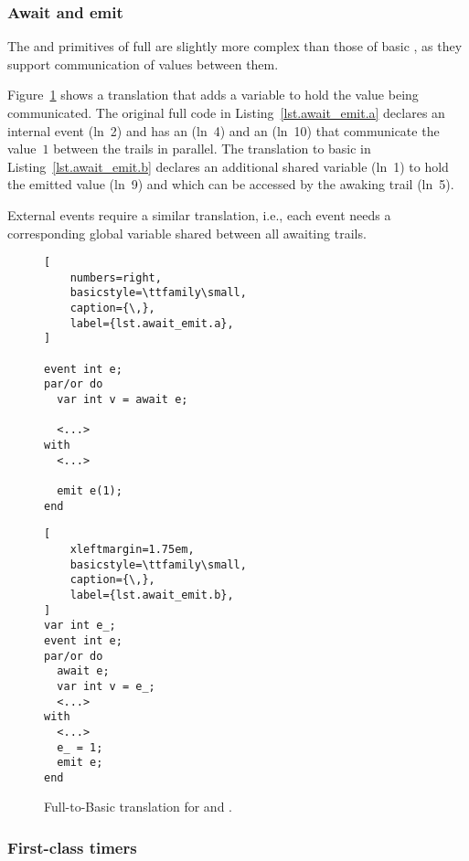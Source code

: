 \subsubsection*{Await and emit}

The  and  primitives of full \CEU are slightly more
complex than those of basic \CEU, as they support communication of values
between them.

Figure~\ref{lst.await_emit} shows a translation that adds a variable to hold
the value being communicated.
%
The original full \CEU code in Listing~\ref{lst.await_emit.a} declares an
internal event  (ln~2) and has an  (ln~4) and an
 (ln~10) that communicate the value~$1$ between the trails in
parallel.
%
The translation to basic \CEU in Listing~\ref{lst.await_emit.b} declares an
additional shared variable  (ln~1) to hold the emitted value
(ln~9) and which can be accessed by the awaking trail (ln~5).

External events require a similar translation, i.e., each event needs a
corresponding global variable shared between all awaiting trails.

\begin{figure}[ht!]
\begin{minipage}[t]{0.48\linewidth}
\begin{lstlisting}[
    numbers=right,
    basicstyle=\ttfamily\small,
    caption={\,},
    label={lst.await_emit.a},
]

event int e;
par/or do
  var int v = await e;

  <...>
with
  <...>

  emit e(1);
end
\end{lstlisting}
\end{minipage}
%
\begin{minipage}[t]{0.45\linewidth}
\begin{lstlisting}[
    xleftmargin=1.75em,
    basicstyle=\ttfamily\small,
    caption={\,},
    label={lst.await_emit.b},
]
var int e_;
event int e;
par/or do
  await e;
  var int v = e_;
  <...>
with
  <...>
  e_ = 1;
  emit e;
end
\end{lstlisting}
\end{minipage}
%
\caption{Full-to-Basic translation for  and . }
\label{lst.await_emit}
\end{figure}

\subsubsection*{First-class timers}

